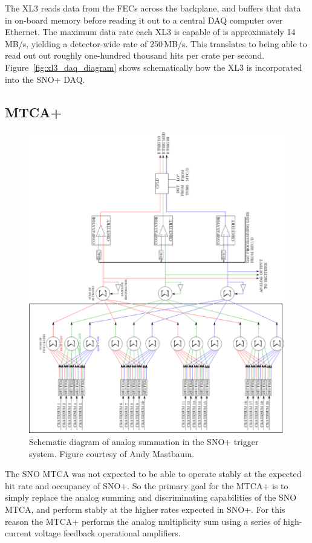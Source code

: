The XL3 reads data from the FECs across the backplane, and buffers that data
in on-board memory before reading it out to a central DAQ computer over Ethernet.
The maximum data rate each XL3 is capable of is approximately
14\,MB/s, yielding a detector-wide rate of 250\,MB/s.
This translates to being able to read out out roughly one-hundred thousand
hits per crate per second.
Figure~\ref{fig:xl3_daq_diagram} shows schematically how the XL3 is
incorporated into the SNO+ DAQ\@.

\subsection{MTCA+}
\label{sec:mtcap}
\begin{figure}[htbp]
    \centering
    \includegraphics[width=1\textwidth]{mtcap_analog_diagram}
    \caption[MTCA+ Analog Diagram]{Schematic diagram of analog
    summation in the SNO+ trigger system. Figure courtesy of
    Andy Mastbaum.}%
\label{fig:mtcap_analog_diagram}
\end{figure}

The SNO MTCA was not expected to be able to operate stably at the expected
hit rate and occupancy of SNO+.
So the primary goal for the MTCA+ is to simply replace the analog summing
and discriminating capabilities of the SNO MTCA, and perform stably
at the higher rates expected in SNO+.
For this reason the MTCA+ performs the analog multiplicity sum using a series
of high-current voltage feedback operational amplifiers.

